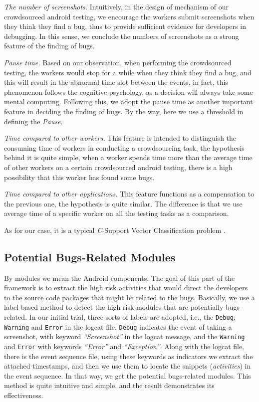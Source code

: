 \documentclass[10pt,conference]{IEEEtran}
\begin{document}
\emph{The number of screenshots.} Intuitively, in the design of mechanism of our crowdsourced android testing,
we encourage the workers submit screenshots when they think they find a bug, thus to provide sufficient evidence for developers
in debugging. In this sense, we conclude the numbers of screenshots as a strong feature of the finding of bugs.

\emph{Pause time.} Based on our observation, when performing the crowdsourced testing, the workers would stop for a while
when they think they find a bug, and this will result in the abnormal time slot between the events, in fact, this phenomenon follows
the cognitive psychology, as a decision will always take some mental computing. Following this, we adopt the pause time as another
important feature in deciding the finding of bugs. By the way, here we use a threshold in defining the \emph{Pause}. 

\emph{Time compared to other workers.} This feature is intended to distinguish the consuming time of workers in conducting a
crowdsourcing task, the hypothesis behind it is quite simple, when a worker spends time more than the average time of other
workers on a certain crowdsourced android testing, there is a high possibility that this worker has found some bugs.

\emph{Time compared to other applications.} This feature functions as a compensation to the previous one, the hypothesis is quite
similar. The difference is that we use average time of a specific worker on all the testing tasks as a comparison.

As for our case, it is a typical \emph{C-}Support Vector Classification problem \cite{chang2011libsvm}. 

\subsection{Potential Bugs-Related Modules}\label{modules}

By modules we mean the Android components. The goal of this part of the framework is to extract the high risk
activities that would direct the developers to the source code packages that might be related to the bugs.
Basically, we use a label-based method to detect the high risk modules that are potentially bugs-related.
In our initial trial, three sorts of labels are adopted, i.e., the \texttt{Debug}, \texttt{Warning} and \texttt{Error}
in the logcat file. \texttt{Debug} indicates the event of taking a screenshot, with keyword \emph{``Screenshot''}
in the logcat message, and the \texttt{Warning} and \texttt{Error} with keywords \emph{``Error''} and \emph{``Exception''}.
Along with the logcat file, there is the event sequence file, using these keywords as indicators we extract the
attached timestamps, and then we use them to locate the snippets (\emph{activities}) in the event sequence.
In that way, we get the potential bugs-related modules. This method is quite intuitive and simple, and the result
demonstrates its effectiveness.
\end{document}
